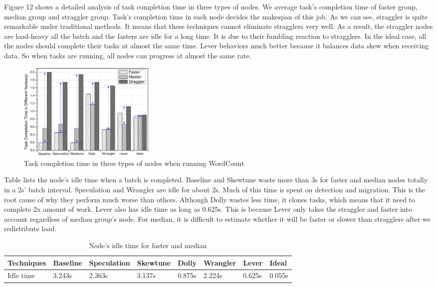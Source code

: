\documentclass[10pt,conference,compsocconf,letterpaper]{IEEEtran}
\begin{document}
  Figure 12 shows a detailed analysis of task completion time in three types of nodes. We average task's completion time of faster group, median group and straggler group. Task's completion time in each node decides the makespan of this job. As we can see, straggler is quite remarkable under traditional methods. It means that these techniques cannot eliminate stragglers very well. As a result, the straggler nodes are load-heavy all the batch and the fasters are idle for a long time. It is due to their fumbling reaction to stragglers. In the ideal case, all the nodes should complete their tasks at almost the same time. Lever behaviors much better because it balances data skew when receiving data. So when tasks are running, all nodes can progress at almost the same rate.
  \begin{figure}[htbp]
    \centering
    \includegraphics[width=0.32\textwidth]{FigureMakeSpan}
    \caption{Task completion time in three types of nodes when running WordCount}
    \label{Fig. 12:}
  \end{figure}

  Table \uppercase\expandafter{} lists the node's idle time when a batch is completed. Baseline and Skewtune waste more than 3s for faster and median nodes totally in a 2s' batch interval. Speculation and Wrangler are idle for about 2s. Much of this time is spent on detection and migration. This is the root cause of why they perform much worse than others. Although Dolly wastes less time, it clones tasks, which means that it need to complete 2x amount of work. Lever also has idle time as long as 0.625s. This is because Lever only takes the straggler and faster into account regardless of median group's node. For median, it is difficult to estimate whether it will be faster or slower than stragglers after we redistribute load.
  \begin{table}[htbp]
    \small
    \centering
    \caption{Node's idle time for faster and median}
    \begin{threeparttable}
    \centering
      \begin{tabular}{|p{1.4cm}|p{1.2cm}|p{1.5cm}|p{1.2cm}|p{0.9cm}|p{1.2cm}|p{0.9cm}|p{0.9cm}|}
        \hline
        Techniques & Baseline & Speculation & Skewtune & Dolly & Wrangler & Lever & Ideal \\
        \hline
        Idle time & 3.243s & 2.363s & 3.137s & 0.875s & 2.224s & 0.625s & 0.055s \\
        \hline
      \end{tabular}
    \end{threeparttable}
    \label{Table3}
  \end{table}
\end{document}

